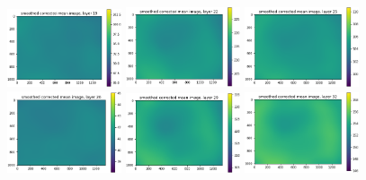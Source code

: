 \documentclass[letterpaper,11pt]{article}
\begin{document}
\begin{figure}[!ht]
\includegraphics[width=0.3\textwidth]{images/results/smoothed_corrected_mean_image_layers/smoothed_corrected_mean_image_layer_19_same_scale}
\includegraphics[width=0.3\textwidth]{images/results/smoothed_corrected_mean_image_layers/smoothed_corrected_mean_image_layer_22_same_scale}
\includegraphics[width=0.3\textwidth]{images/results/smoothed_corrected_mean_image_layers/smoothed_corrected_mean_image_layer_25_same_scale}
\includegraphics[width=0.3\textwidth]{images/results/smoothed_corrected_mean_image_layers/smoothed_corrected_mean_image_layer_26_same_scale}
\includegraphics[width=0.3\textwidth]{images/results/smoothed_corrected_mean_image_layers/smoothed_corrected_mean_image_layer_29_same_scale}
\includegraphics[width=0.3\textwidth]{images/results/smoothed_corrected_mean_image_layers/smoothed_corrected_mean_image_layer_32_same_scale}

\end{figure}
\end{document}
